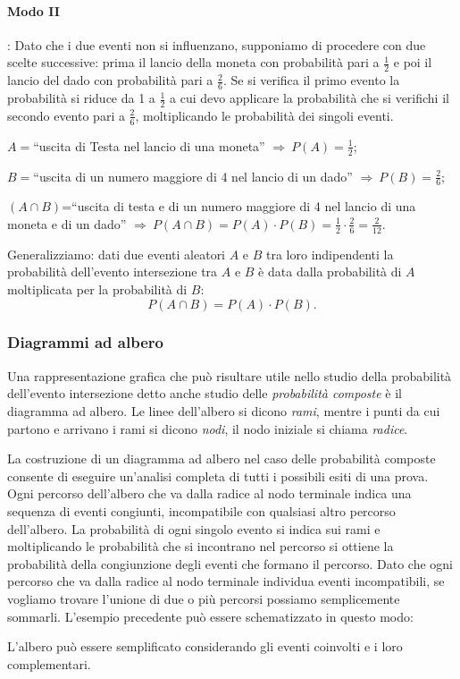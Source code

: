 \begin{exrig}
\begin{esempio}
\paragraph{Modo II}: Dato che i due eventi non si influenzano, supponiamo di procedere con due scelte successive: prima il lancio della moneta con probabilità pari a $\frac 1 2$ e poi il lancio del dado con probabilità pari a $\frac 2 6$. Se si verifica il primo evento la probabilità si riduce da 1 a $\frac 1 2$ a cui devo applicare la probabilità che si verifichi il secondo evento pari a $\frac 2 6$, moltiplicando le probabilità dei singoli eventi.
\begin{itemize*}
\item $A=$``uscita di Testa nel lancio di una moneta'' $\Rightarrow\: P(A)=\frac 1 2$;
\item $B=$``uscita di un numero maggiore di 4 nel lancio di un dado'' $\Rightarrow\: P(B)=\frac 2 6$;
\item $(A\cap B)$=``uscita di testa e di un numero maggiore di 4 nel lancio di una moneta e di un dado'' $\Rightarrow\: P(A\cap B)=P(A)\cdot P(B)=\frac 1 2\cdot \frac 2 6=\frac 2{12}$.
\end{itemize*}
\end{esempio}
\end{exrig}

Generalizziamo: dati due eventi aleatori $A$ e $B$ tra loro indipendenti la probabilità dell'evento intersezione tra $A$ e $B$ è data dalla probabilità di $A$ moltiplicata per la probabilità di $B$: \[P(A\cap B)=P(A)\cdot P(B).\]\label{reg:probabilita_intersezione_eventi_indipendenti}

\subsubsection*{Diagrammi ad albero}

Una rappresentazione grafica che può risultare utile nello studio della probabilità dell'evento intersezione detto anche studio delle \emph{probabilità composte} è il diagramma ad albero. Le linee dell'albero si dicono \emph{rami}, mentre i punti da cui partono e arrivano i rami si dicono \emph{nodi}, il nodo iniziale si chiama \emph{radice}.

La costruzione di un diagramma ad albero nel caso delle probabilità composte consente di eseguire un'analisi completa di tutti i possibili esiti di una prova. Ogni percorso dell'albero che va dalla radice al nodo terminale indica una sequenza di eventi congiunti, incompatibile con qualsiasi altro percorso dell'albero. La probabilità di ogni singolo evento si indica sui rami e moltiplicando le probabilità che si incontrano nel percorso si ottiene la probabilità della congiunzione degli eventi che formano il percorso. Dato che ogni percorso che va dalla radice al nodo terminale individua eventi incompatibili, se vogliamo trovare l'unione di due o più percorsi possiamo semplicemente sommarli.
L'esempio precedente può essere schematizzato in questo modo:
\begin{center}
 
\end{center}
L'albero può essere semplificato considerando gli eventi coinvolti e i loro complementari.

